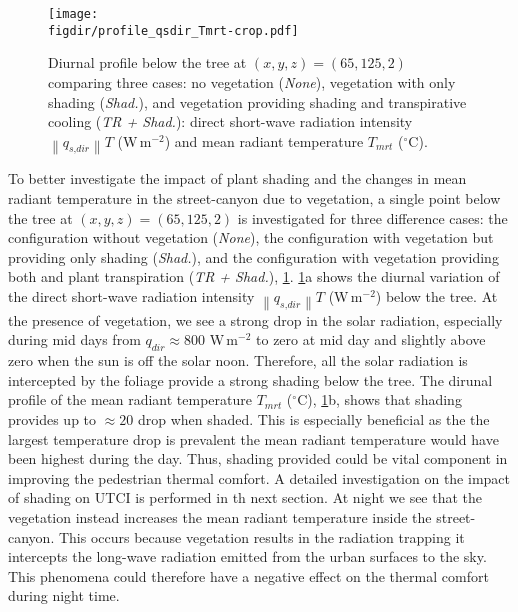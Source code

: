 \begin{figure}[t]
	\centering
	\texttt{[image: \\figdir/profile\_qsdir\_Tmrt-crop.pdf]}
	\caption{Diurnal profile below the tree at $(x,y,z) = (65, 125, 2)$ comparing three cases: no vegetation (\textit{None}), vegetation with only shading (\textit{Shad.}), and vegetation providing shading and transpirative cooling (\textit{TR + Shad.}):  direct short-wave radiation intensity $\left\|q_{\textit{s,dir}}\right\|T$ (W\,m$^{-2}$) and  mean radiant temperature $T_{\textit{mrt}}$  ($^{\circ}$C). }
	\label{fig:profile_qsdir_Tmrt}
\end{figure}

To better investigate the impact of plant shading and the changes in mean radiant temperature in the street-canyon due to vegetation, a single point below the tree at $(x,y,z) = (65, 125, 2)$ is investigated for three difference cases: the configuration without vegetation (\textit{None}), the configuration with vegetation but providing only shading (\textit{Shad.}), and the configuration with vegetation providing both and plant transpiration (\textit{TR + Shad.}), \cref{fig:profile_qsdir_Tmrt}. \cref{fig:profile_qsdir_Tmrt}a shows the diurnal variation of the direct short-wave radiation intensity $\left\|q_{\textit{s,dir}}\right\|T$ (W\,m$^{-2}$) below the tree. At the presence of vegetation, we see a strong drop in the solar radiation, especially during mid days from $q_{dir} \approx 800$ W\,m$^{-2}$ to zero at mid day and slightly above zero when the sun is off the solar noon. Therefore, all the solar radiation is intercepted by the foliage provide a strong shading below the tree. The dirunal profile of the mean radiant temperature $T_{\textit{mrt}}$  ($^{\circ}$C), \cref{fig:profile_qsdir_Tmrt}b, shows that shading provides up to $\approx 20$ drop when shaded. This is especially beneficial as the the largest temperature drop is prevalent the mean radiant temperature would have been highest during the day. Thus, shading provided could be vital component in improving the pedestrian thermal comfort. A detailed investigation on the impact of shading on UTCI is performed in th next section. At night we see that the vegetation instead increases the mean radiant temperature inside the street-canyon. This occurs because vegetation results in the radiation trapping it intercepts the long-wave radiation emitted from the urban surfaces to the sky. This phenomena could therefore have a negative effect on the thermal comfort during night time. 

